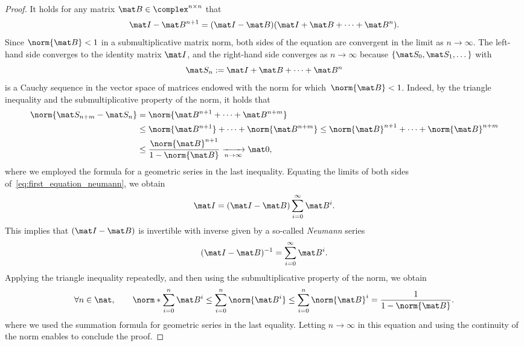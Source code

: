 \begin{proof}
    It holds for any matrix $\mat B \in \complex^{n \times n}$ that
    \begin{equation}
        \label{eq:first_equation_neumann}
        \mat I - \mat B^{n+1} = (\mat I - \mat B)(\mat I + \mat B + \dotsb + \mat B^n).
    \end{equation}
    Since $\norm{\mat B} < 1$ in a submultiplicative matrix norm,
    both sides of the equation are convergent in the limit as $n \to \infty$.
    The left-hand side converges to the identity matrix $\mat I$,
    and the right-hand side converges as $n \to \infty$ because $\{\mat S_0, \mat S_1, \dotsc\}$ with
    \[
        \mat S_n := \mat I + \mat B + \dotsb + \mat B^n
    \]
    is a Cauchy sequence in the vector space of matrices endowed with the norm for which~$\norm{\mat B} < 1$.
    Indeed, by the triangle inequality and the submultiplicative property of the norm,
    it holds that
    \begin{align*}
        \norm{\mat S_{n+m} - \mat S_n}
        &= \norm{\mat B^{n+1} + \dotsb + \mat B^{n+m}} \\
        &\leq \norm{\mat B^{n+1}} + \dotsb + \norm{\mat B^{n+m}}
        \leq \norm{\mat B}^{n+1} + \dotsb + \norm{\mat B}^{n+m} \\
        &\leq  \frac{\norm{\mat B}^{n+1}}{1 - \norm{\mat B}} \xrightarrow[n \to \infty]{} \mat 0,
    \end{align*}
    where we employed the formula for a geometric series in the last inequality.
    Equating the limits of both sides of~\eqref{eq:first_equation_neumann},
    we obtain
    \[
        \mat I = (\mat I - \mat B) \sum_{i=0}^{\infty} \mat B^i.
    \]
    This implies that $(\mat I - \mat B)$ is invertible with inverse
    given by a so-called \emph{Neumann} series
    \begin{equation*}
        (\mat I - \mat B)^{-1} = \sum_{i=0}^{\infty} \mat B^i.
    \end{equation*}
    Applying the triangle inequality repeatedly,
    and then using the submultiplicative property of the norm,
    we obtain
    \[
        \forall n \in \nat,
        \qquad
        \norm*{\sum_{i=0}^{n} \mat B^i}
        \leq \sum_{i=0}^{n} \norm{\mat B^i}
        \leq \sum_{i=0}^{n} \norm{\mat B}^i
        = \frac{1}{1 - \norm{\mat B}}.
    \]
    where we used the summation formula for geometric series in the last equality.
    Letting $n \to \infty$ in this equation and
    using the continuity of the norm enables to conclude the proof.
\end{proof}

